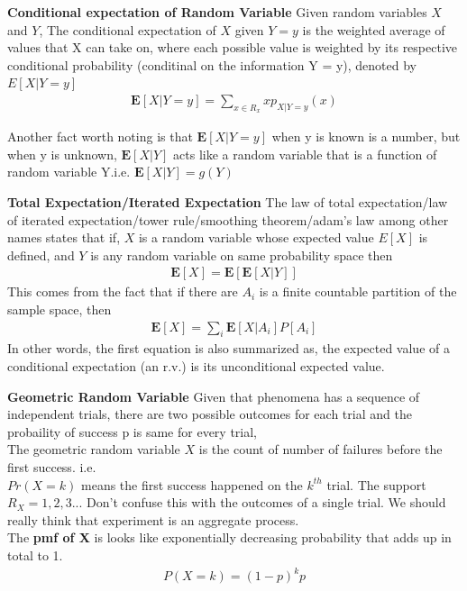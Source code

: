 \documentclass[10pt,a4paper]{article}
\begin{document}
	\begin{defn}{\textbf{Conditional expectation of Random Variable}}
		Given random variables $X$ and $Y$, The conditional expectation of $X$ given $Y = y$ is the weighted average of values that X can take on, where each possible value is weighted by its respective conditional probability (conditinal on the information Y = y), denoted by $E[X|Y = y]$
		\begin{align}
			\mathbf{E}[X|Y = y] = \sum_{x \in R_x} xp_{X|Y = y}(x)
		\end{align}
		
		Another fact worth noting is that $\mathbf{E}[X|Y=y]$ when y is known is a number, but when y is unknown, $\mathbf{E}[X|Y]$ acts like a random variable that is a function of random variable Y.i.e. $\mathbf{E}[X|Y] = g(Y)$
	\end{defn}

	\begin{defn}{\textbf{Total Expectation/Iterated Expectation}}
		The law of total expectation/law of iterated expectation/tower rule/smoothing theorem/adam's law among other names states that if,
		$X$ is a random variable whose expected value $E[X]$ is defined, and $Y$ is any random variable on same probability space then
		\begin{align}
			\mathbf{E}[X] = \mathbf{E}[\mathbf{E}[X|Y]]
		\end{align}
		This comes from the fact that if there are $A_i$ is a finite countable partition of the sample space,
		then
		\begin{align}
			\mathbf{E}[X] = \sum_{i}\mathbf{E}[X|A_i]P[A_i]
		\end{align}
		In other words, the first equation is also summarized as, the expected value of a conditional expectation (an r.v.) is its unconditional expected value.
	\end{defn}

	\begin{defn}{\textbf{Geometric Random Variable}}
		Given that phenomena has a sequence of independent trials, there are two possible outcomes for each trial and the probaility of success p is same for every trial, \\
		The geometric random variable $X$ is the count of number of failures before the first success.
		i.e. \\ 
		$Pr(X = k)$ means the first success happened on the $k^{th}$ trial.
		The support $R_X={1,2,3..}$.  Don't confuse this with the outcomes of a single trial. We should really think that experiment is an aggregate process.\\
		The \textbf{pmf of X} is looks like exponentially decreasing probability that adds up in total to 1.
		\begin{align}
			P(X = k) = (1-p)^{k}p
		\end{align}
		
	\end{defn}
\end{document}
